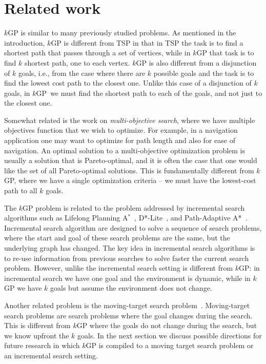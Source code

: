 \documentclass{aicom2e}
\newcommand{\kgs}{$k$GP}
\newcommand{\astar}{A$^*$}
\begin{document}
\section{Related work}
\label{sec:related-work}

\kgs{} is similar to many previously studied problems. As mentioned in the introduction, \kgs{} is different from TSP in that in TSP the task is to find a shortest path that passes through a set of vertices, while in \kgs{} that task is to find $k$ shortest path, one to each vertex. %
\kgs{} is also different from a disjunction of $k$ goals, i.e., from the case where there are $k$ possible goals and the task is to find the lowest cost path to the closest one. Unlike this case of a disjunction of $k$ goals, in \kgs\ we must find the shortest path to each of the goals, and not just to the closest one.

Somewhat related is the work on {\em multi-objective search}, where we have multiple objectives function that we wish to optimize. For example, in a navigation application one may want to optimize for path length and also for ease of navigation. An optimal solution to a multi-objective optimization problem is usually a solution that is Pareto-optimal, and it is often the case that one would like the set of all Pareto-optimal solutions. This is fundamentally different from \kgs{}, where we have a single optimization criteria -- we must have the lowest-cost path to all $k$ goals.


The \kgs{} problem is related to the problem addressed by incremental search algorithms such as Lifelong Planning \astar{}~\cite{koenig2004lifelong},  D*-Lite~\cite{koenig2005fast}, and Path-Adaptive A*~\cite{hernandez2015reusing}. Incremental search algorithm are designed to solve a sequence of search problems, where the start and goal of these search problems are the same, but the underlying graph has changed. The key idea in incremental search algorithms is to re-use information from previous searches to solve faster the current search problem. However, unlike the incremental search setting is different from \kgs{}: in incremental search we have one goal and the environment is dynamic, while in \kgs{} we have $k$ goals but assume the environment does not change.

Another related problem is the moving-target search problem~\cite{koenig2007speeding,ishida1991moving}. Moving-target search problems are search problems where the goal changes during the search. This is different from \kgs{} where the goals do not change during the search, but we know upfront the $k$ goals. In the next section we discuss possible directions for future research in which \kgs{} is compiled to a moving target search problem or an incremental search setting. %
\end{document}
